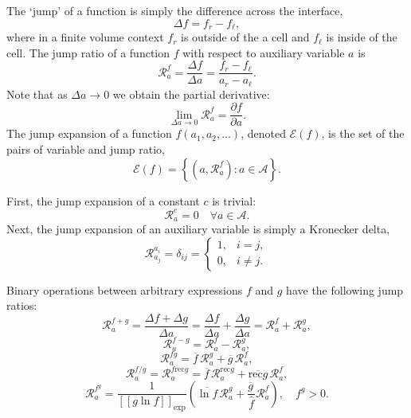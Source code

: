 \documentclass[10pt]{article}
\renewcommand{\j}[1]{\Delta #1}
\newcommand{\jr}[2]{\mathcal{R}^{#1}_{#2}}
\newcommand{\je}[1]{\mathcal{E}\left(#1\right)}
\newcommand{\rec}{\mathrm{rec}}
\newcommand{\avg}[1]{\overline{#1}\,}
\newcommand{\logavg}[1]{\widehat{#1}}
\newcommand{\spavg}[2]{\left[\left[#1\right]\right]_{\mathrm{#2}}}
\begin{document}
The `jump' of a function is simply the difference across the interface,
\begin{equation}
	\j{f} = f_r - f_\ell,
\end{equation}
where in a finite volume context $f_r$ is outside of the a cell and $f_\ell$ is inside of the cell.
The jump ratio of a function $f$ with respect to auxiliary variable $a$ is
\begin{equation}
	\jr{f}{a} = \frac{\j{f}}{\j{a}} = \frac{f_r - f_\ell}{a_r - a_\ell}.
\end{equation}
Note that as $\j{a}\to0$ we obtain the partial derivative:
\begin{equation}
	\lim_{\j{a}\to0}\jr{f}{a} = \frac{\partial f}{\partial a}.
\end{equation}
The jump expansion of a function $f(a_1,a_2,\ldots)$, denoted $\je{f}$, is the set of the pairs of variable and jump ratio,
\begin{equation}
	\je{f} = \left\{\left(a,\jr{f}{a}\right) : a \in \mathcal{A}\right\}.
\end{equation}

First, the jump expansion of a constant $c$ is trivial:
\begin{equation}
	\jr{c}{a} = 0 \quad \forall a \in \mathcal{A}.
\end{equation}
Next, the jump expansion of an auxiliary variable is simply a Kronecker delta,
\begin{equation}
	\jr{a_i}{a_j} = \delta_{ij} =
	\begin{cases}
		1, & i=j, \\
		0, & i \neq j.
	\end{cases}
\end{equation}

Binary operations between arbitrary expressions $f$ and $g$ have the following jump ratios:
\begin{equation}
	\jr{f+g}{a} = \frac{\j{f}+\j{g}}{\j{a}} = \frac{\j{f}}{\j{a}} + \frac{\j{g}}{\j{a}} = \jr{f}{a} + \jr{g}{a},
\end{equation}
\begin{equation}
	\jr{f-g}{a} = \jr{f}{a} - \jr{g}{a},
\end{equation}
\begin{equation}
	\jr{fg}{a} = \avg{f}\jr{g}{a} + \avg{g}\jr{f}{a},
\end{equation}
\begin{equation}
	\jr{f/g}{a} = \jr{f\rec{g}}{a} = \avg{f}\jr{\rec{g}}{a} + \avg{\rec{g}}\jr{f}{a},
\end{equation}
\begin{equation}
	\jr{f^g}{a} = \frac{1}{\spavg{g\ln f}{\exp}}\left(\avg{\ln f}\jr{g}{a} + \frac{\avg{g}}{\logavg{f}}\jr{f}{a}\right), \quad f^g > 0.
\end{equation}
\end{document}
